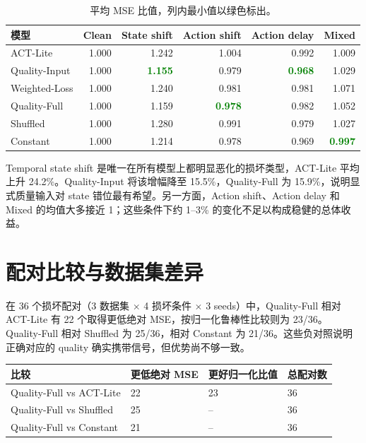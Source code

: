 \documentclass[11pt,a4paper]{ctexart}
\newcommand{\good}[1]{\textcolor{green}{\bfseries #1}}
\begin{document}
\begin{table}[htbp]
\centering
\small
\begin{tabular}{lrrrrr}
\toprule
模型 & Clean & State shift & Action shift & Action delay & Mixed\\
\midrule
ACT-Lite & 1.000 & 1.242 & 1.004 & 0.992 & 1.009\\
Quality-Input & 1.000 & \good{1.155} & 0.979 & \good{0.968} & 1.029\\
Weighted-Loss & 1.000 & 1.240 & 0.981 & 0.981 & 1.071\\
Quality-Full & 1.000 & 1.159 & \good{0.978} & 0.982 & 1.052\\
Shuffled & 1.000 & 1.280 & 0.991 & 0.979 & 1.027\\
Constant & 1.000 & 1.214 & 0.978 & 0.969 & \good{0.997}\\
\bottomrule
\end{tabular}
\caption{平均 MSE 比值，列内最小值以绿色标出。}
\end{table}

Temporal state shift 是唯一在所有模型上都明显恶化的损坏类型，ACT-Lite 平均上升 24.2\%。Quality-Input 将该增幅降至 15.5\%，Quality-Full 为 15.9\%，说明显式质量输入对 state 错位最有希望。另一方面，Action shift、Action delay 和 Mixed 的均值大多接近 1；这些条件下约 1--3\% 的变化不足以构成稳健的总体收益。

\section{配对比较与数据集差异}

在 36 个损坏配对（3 数据集 $\times$ 4 损坏条件 $\times$ 3 seeds）中，Quality-Full 相对 ACT-Lite 有 22 个取得更低绝对 MSE，按归一化鲁棒性比较则为 23/36。Quality-Full 相对 Shuffled 为 25/36，相对 Constant 为 21/36。这些负对照说明正确对应的 quality 确实携带信号，但优势尚不够一致。

\begin{table}[htbp]
\centering
\small
\begin{tabularx}{\linewidth}{Y C{27mm} C{27mm} C{31mm}}
\toprule
比较 & 更低绝对 MSE & 更好归一化比值 & 总配对数\\
\midrule
Quality-Full vs ACT-Lite & 22 & 23 & 36\\
Quality-Full vs Shuffled & 25 & -- & 36\\
Quality-Full vs Constant & 21 & -- & 36\\
\bottomrule
\end{tabularx}
\end{table}
\end{document}
